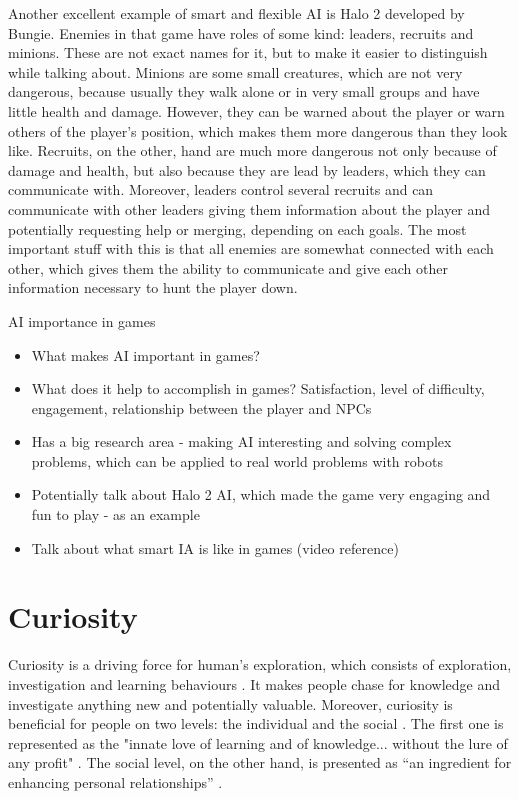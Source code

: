 \documentclass[journal]{IEEEtran}
\begin{document}
Another excellent example of smart and flexible AI is Halo 2 developed by Bungie. Enemies in that game have roles of some kind: leaders, recruits and minions. These are not exact names for it, but to make it easier to distinguish while talking about. Minions are some small creatures, which are not very dangerous, because usually they walk alone or in very small groups and have little health and damage. However, they can be warned about the player or warn others of the player's position, which makes them more dangerous than they look like. Recruits, on the other, hand are much more dangerous not only because of damage and health, but also because they are lead by leaders, which they can communicate with. Moreover, leaders control several recruits and can communicate with other leaders giving them information about the player and potentially requesting help or merging, depending on each goals. The most important stuff with this is that all enemies are somewhat connected with each other, which gives them the ability to communicate and give each other information necessary to hunt the player down.

AI importance in games
\begin{itemize}
	\item What makes AI important in games?
	\item What does it help to accomplish in games? Satisfaction, level of difficulty, engagement, relationship between the player and NPCs
	\item Has a big research area - making AI interesting and solving complex problems, which can be applied to real world problems with robots
	\item Potentially talk about Halo 2 AI, which made the game very engaging and fun to play - as an example
	\item Talk about what smart IA is like in games (video reference)
\end{itemize}

\section{Curiosity}
Curiosity is a driving force for human's exploration, which consists of exploration, investigation and learning behaviours \cite{wu2013curiosity}\cite{kashdan2004curiosity}. It makes people chase for knowledge and investigate anything new and potentially valuable. Moreover, curiosity is beneficial for people on two levels: the individual and the social \cite{kashdan2010curiosity}. The first one is represented as the "innate love of learning and of knowledge... without the lure of any profit" \cite{loewenstein1994psychology}. The social level, on the other hand, is presented as ``an ingredient for enhancing personal relationships'' \cite{wu2013curiosity}.
\end{document}
